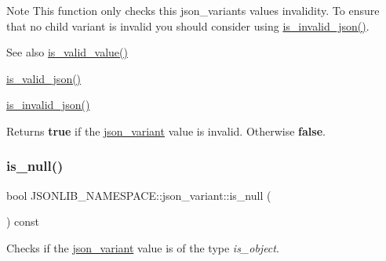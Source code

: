 \begin{DoxyNote}{Note}
This function only checks this json\+\_\+variants values invalidity. To ensure that no child variant is invalid you should consider using \hyperlink{classJSONLIB__NAMESPACE_1_1json__variant_a1a08b35da4cf3a334d32ebb81b20c08a}{is\+\_\+invalid\+\_\+json()}. 
\end{DoxyNote}
\begin{DoxySeeAlso}{See also}
\hyperlink{classJSONLIB__NAMESPACE_1_1json__variant_a224aab2dd56e3928dd893be8b7f3367a}{is\+\_\+valid\+\_\+value()} 

\hyperlink{classJSONLIB__NAMESPACE_1_1json__variant_a158e3148d9256af3d1b8251b2ca7b6c4}{is\+\_\+valid\+\_\+json()} 

\hyperlink{classJSONLIB__NAMESPACE_1_1json__variant_a1a08b35da4cf3a334d32ebb81b20c08a}{is\+\_\+invalid\+\_\+json()} 
\end{DoxySeeAlso}
\begin{DoxyReturn}{Returns}
{\bfseries true} if the \hyperlink{classJSONLIB__NAMESPACE_1_1json__variant}{json\+\_\+variant} value is invalid. Otherwise {\bfseries false}. 
\end{DoxyReturn}
\mbox{\label{classJSONLIB__NAMESPACE_1_1json__variant_abe8f66e81c598b6a9109a65e6844c5b5}} 
\subsubsection{\texorpdfstring{is\+\_\+null()}{is\_null()}\hspace{0.1cm}{\footnotesize\ttfamily [1/2]}}
{\footnotesize\ttfamily bool J\+S\+O\+N\+L\+I\+B\+\_\+\+N\+A\+M\+E\+S\+P\+A\+C\+E\+::json\+\_\+variant\+::is\+\_\+null (\begin{DoxyParamCaption}{ }\end{DoxyParamCaption}) const}



Checks if the \hyperlink{classJSONLIB__NAMESPACE_1_1json__variant}{json\+\_\+variant} value is of the type {\itshape is\+\_\+object}. 

